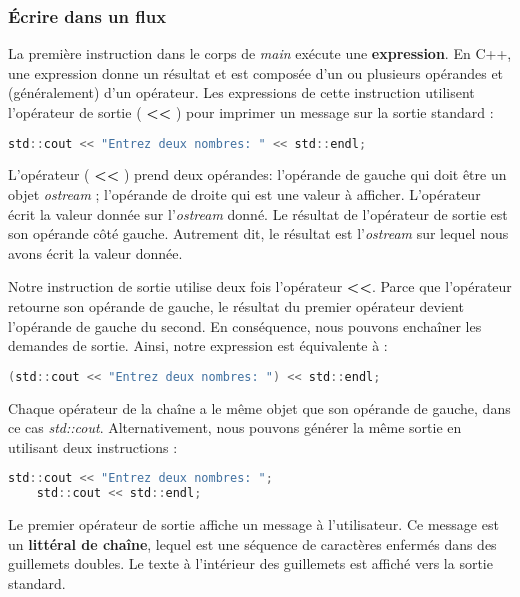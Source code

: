 \subsubsection{Écrire dans un flux}

La première instruction dans le corps de \textit{main} exécute une \textbf{expression}. En C++, une expression donne un résultat et est composée d'un ou plusieurs opérandes et (généralement) d'un opérateur. Les expressions de cette instruction utilisent l'opérateur de sortie ( \textbf{<<} ) pour imprimer un message sur la sortie standard :

\medbreak
\begin{lstlisting}[language=C]
	std::cout << "Entrez deux nombres: " << std::endl;
\end{lstlisting}
\medbreak

L'opérateur ( \textbf{<<} ) prend deux opérandes: l'opérande de gauche qui doit être un objet \textit{ostream} ; l'opérande de droite qui est une valeur à afficher. L'opérateur écrit la valeur donnée sur l'\textit{ostream} donné. Le résultat de l'opérateur de sortie est son opérande côté gauche. Autrement dit, le résultat est l'\textit{ostream} sur lequel nous avons écrit la valeur donnée.

Notre instruction de sortie utilise deux fois l'opérateur \textbf{<<}. Parce que l'opérateur retourne son opérande de gauche, le résultat du premier opérateur devient l'opérande de gauche du second. En conséquence, nous pouvons enchaîner les demandes de sortie. Ainsi, notre expression est équivalente à :

\medbreak
\begin{lstlisting}[language=C]
	(std::cout << "Entrez deux nombres: ") << std::endl;
\end{lstlisting}
\medbreak

Chaque opérateur de la chaîne a le même objet que son opérande de gauche, dans ce cas \textit{std::cout}. Alternativement, nous pouvons générer la même sortie en utilisant deux instructions :

\medbreak
\begin{lstlisting}[language=C]
	std::cout << "Entrez deux nombres: ";
	std::cout << std::endl;
\end{lstlisting}
\medbreak

Le premier opérateur de sortie affiche un message à l'utilisateur. Ce message est un \textbf{littéral de chaîne}, lequel est une séquence de caractères enfermés dans des guillemets doubles. Le texte à l'intérieur des guillemets est affiché vers la sortie standard.

